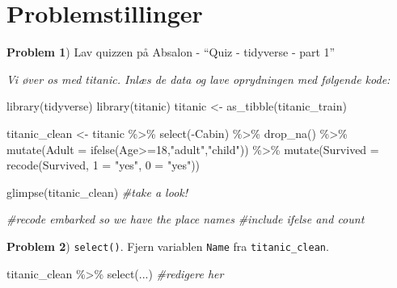 \documentclass[
]{book}
\newenvironment{Shaded}{\begin{snugshade}}{\end{snugshade}}
\newcommand{\AttributeTok}[1]{\textcolor[rgb]{0.77,0.63,0.00}{#1}}
\newcommand{\CommentTok}[1]{\textcolor[rgb]{0.56,0.35,0.01}{\textit{#1}}}
\newcommand{\DecValTok}[1]{\textcolor[rgb]{0.00,0.00,0.81}{#1}}
\newcommand{\FunctionTok}[1]{\textcolor[rgb]{0.00,0.00,0.00}{#1}}
\newcommand{\NormalTok}[1]{#1}
\newcommand{\OtherTok}[1]{\textcolor[rgb]{0.56,0.35,0.01}{#1}}
\newcommand{\SpecialCharTok}[1]{\textcolor[rgb]{0.00,0.00,0.00}{#1}}
\newcommand{\StringTok}[1]{\textcolor[rgb]{0.31,0.60,0.02}{#1}}
\begin{document}
\hypertarget{problemstillinger-4}{%
\section{Problemstillinger}\label{problemstillinger-4}}

\textbf{Problem 1}) Lav quizzen på Absalon - ``Quiz - tidyverse - part 1''

\emph{Vi øver os med titanic. Inlæs de data og lave oprydningen med følgende kode:}

\begin{Shaded}
\begin{Highlighting}[]
\FunctionTok{library}\NormalTok{(tidyverse)}
\FunctionTok{library}\NormalTok{(titanic)}
\NormalTok{titanic }\OtherTok{\textless{}{-}} \FunctionTok{as\_tibble}\NormalTok{(titanic\_train)}

\NormalTok{titanic\_clean }\OtherTok{\textless{}{-}}\NormalTok{ titanic }\SpecialCharTok{\%\textgreater{}\%} 
    \FunctionTok{select}\NormalTok{(}\SpecialCharTok{{-}}\NormalTok{Cabin) }\SpecialCharTok{\%\textgreater{}\%} 
    \FunctionTok{drop\_na}\NormalTok{() }\SpecialCharTok{\%\textgreater{}\%} 
    \FunctionTok{mutate}\NormalTok{(}\AttributeTok{Adult =} \FunctionTok{ifelse}\NormalTok{(Age}\SpecialCharTok{\textgreater{}=}\DecValTok{18}\NormalTok{,}\StringTok{"adult"}\NormalTok{,}\StringTok{"child"}\NormalTok{)) }\SpecialCharTok{\%\textgreater{}\%}
    \FunctionTok{mutate}\NormalTok{(}\AttributeTok{Survived =} \FunctionTok{recode}\NormalTok{(Survived,  }\StringTok{\textasciigrave{}}\AttributeTok{1}\StringTok{\textasciigrave{}} \OtherTok{=} \StringTok{"yes"}\NormalTok{, }\StringTok{\textasciigrave{}}\AttributeTok{0}\StringTok{\textasciigrave{}} \OtherTok{=} \StringTok{"yes"}\NormalTok{)) }
    
\FunctionTok{glimpse}\NormalTok{(titanic\_clean) }\CommentTok{\#take a look!}

\CommentTok{\#recode embarked so we have the place names}
\CommentTok{\#include ifelse and count}
\end{Highlighting}
\end{Shaded}

\textbf{Problem 2}) \texttt{select()}. Fjern variablen \texttt{Name} fra \texttt{titanic\_clean}.

\begin{Shaded}
\begin{Highlighting}[]
\NormalTok{titanic\_clean }\SpecialCharTok{\%\textgreater{}\%} 
    \FunctionTok{select}\NormalTok{(...) }\CommentTok{\#redigere her}
\end{Highlighting}
\end{Shaded}
\end{document}
